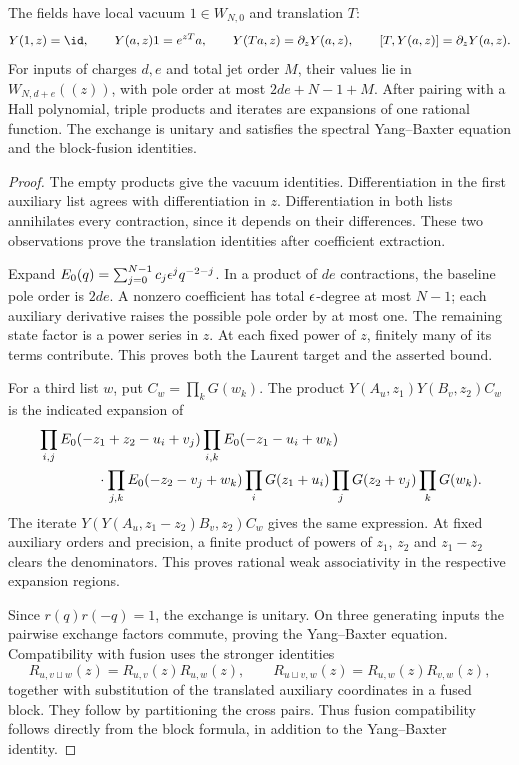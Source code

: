 \begin{theorem}\label{cyjets:thm:fields}
The fields have local vacuum $1\in W_{N,0}$ and translation $T$:
\[
 Y(1,z)=\id,\qquad Y(a,z)1=e^{zT}a,\qquad
 Y(Ta,z)=\partial_zY(a,z),\qquad [T,Y(a,z)]=\partial_zY(a,z).
\]
For inputs of charges $d,e$ and total jet order $M$, their values lie
in $W_{N,d+e}((z))$, with pole order at most $2de+N-1+M$.
After pairing with a Hall polynomial, triple products and iterates
are expansions of one rational function. The exchange is unitary and satisfies the spectral
Yang--Baxter equation and the block-fusion identities.
\end{theorem}
\begin{proof}
The empty products give the vacuum identities. Differentiation in
the first auxiliary list agrees with differentiation in $z$.
Differentiation in both lists annihilates every contraction, since
it depends on their differences. These two observations prove the
translation identities after coefficient extraction.

Expand $E_0(q)=\sum_{j=0}^{N-1}c_j\epsilon^j q^{-2-j}$.
In a product of $de$ contractions, the baseline pole order is $2de$.
A nonzero coefficient has total $\epsilon$-degree at most $N-1$;
each auxiliary derivative raises the possible pole order by at most
one. The remaining state factor is a power series in $z$.
At each fixed power of $z$, finitely many of its terms contribute.
This proves both the Laurent target and the asserted bound.

For a third list $w$, put $C_w=\prod_kG(w_k)$. The product
$Y(A_u,z_1)Y(B_v,z_2)C_w$ is the indicated expansion of
\begin{align*}
 &\prod_{i,j}E_0(-z_1+z_2-u_i+v_j)
  \prod_{i,k}E_0(-z_1-u_i+w_k)\\
 &\hspace{15mm}\cdot\prod_{j,k}E_0(-z_2-v_j+w_k)
  \prod_iG(z_1+u_i)\prod_jG(z_2+v_j)\prod_kG(w_k).
\end{align*}
The iterate $Y(Y(A_u,z_1-z_2)B_v,z_2)C_w$ gives the same
expression. At fixed auxiliary orders and precision, a finite product
of powers of $z_1$, $z_2$ and $z_1-z_2$ clears the denominators.
This proves rational weak associativity in the respective expansion
regions.

Since $r(q)r(-q)=1$, the exchange is unitary. On three generating
inputs the pairwise exchange factors commute, proving the
Yang--Baxter equation. Compatibility with fusion uses the stronger
identities
\[
 R_{u,v\sqcup w}(z)=R_{u,v}(z)R_{u,w}(z),\qquad
 R_{u\sqcup v,w}(z)=R_{u,w}(z)R_{v,w}(z),
\]
together with substitution of the translated auxiliary coordinates
in a fused block. They follow by partitioning the cross pairs.
Thus fusion compatibility follows directly from the block formula,
in addition to the Yang--Baxter identity.
\end{proof}

